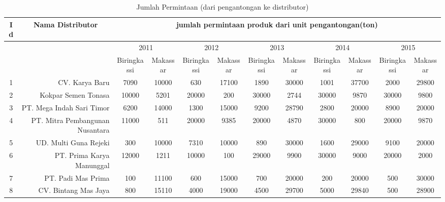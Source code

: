 \documentclass{article}
\begin{document}
\begin{table}[h]
	\caption{Jumlah Permintaan (dari pengantongan ke distributor)}
	\begin{tabular}{|c|r|c|c|c|c|c|c|c|c|c|c|}
		\hline
		\multicolumn{ 1}{|c|}{Id} & \multicolumn{ 1}{|c|}{Nama Distributor} &                                                    \multicolumn{ 10}{|c|}{jumlah permintaan produk dari unit pengantongan(ton)} \\
		\hline
		\multicolumn{ 1}{|c|}{} & \multicolumn{ 1}{|c|}{} & \multicolumn{ 2}{|c|}{2011} & \multicolumn{ 2}{|c|}{2012} & \multicolumn{ 2}{|c|}{2013} & \multicolumn{ 2}{|c|}{2014} & \multicolumn{ 2}{|c|}{2015} \\
		\hline
		\multicolumn{ 1}{|c|}{} & \multicolumn{ 1}{|c|}{} & Biringkassi &   Makassar & Biringkassi &   Makassar & Biringkassi &   Makassar & Biringkassi &   Makassar & Biringkassi &   Makassar \\
		\hline
		1 & CV. Karya Baru &       7090 &      10000 &        630 &      17100 &       1890 &      30000 &       1001 &      37700 &       2000 &      29800 \\
		\hline
		2 & Kokpar Semen Tonasa &      10000 &       5201 &      20000 &        200 &      30000 &       2744 &      30000 &       9870 &      30000 &       9800 \\
		\hline
		3 & PT. Mega Indah Sari Timor &       6200 &      14000 &       1300 &      15000 &       9200 &      28790 &       2800 &      20000 &       8900 &      20000 \\
		\hline
		4 & PT. Mitra Pembangunan Nusantara &      11000 &        511 &      20000 &       9385 &      20000 &       4870 &      30000 &        800 &      20000 &       9870 \\
		\hline
		5 & UD. Multi Guna Rejeki &        300 &      10000 &       7310 &      10000 &        890 &      30000 &       1600 &      29000 &       9100 &      20000 \\
		\hline
		6 & PT. Prima Karya Manunggal &      12000 &       1211 &      10000 &        100 &      29000 &       9900 &      30000 &       9000 &      20000 &       2000 \\
		\hline
		7 & PT. Padi Mas Prima &        100 &      11100 &        600 &      15000 &        700 &      20000 &        200 &      20000 &        500 &      30000 \\
		\hline
		8 & CV. Bintang Mas Jaya &        800 &      15110 &       4000 &      19000 &       4500 &      29700 &       5000 &      29840 &        500 &      28900 \\

\end{tabular}
\end{table}
\end{document}

